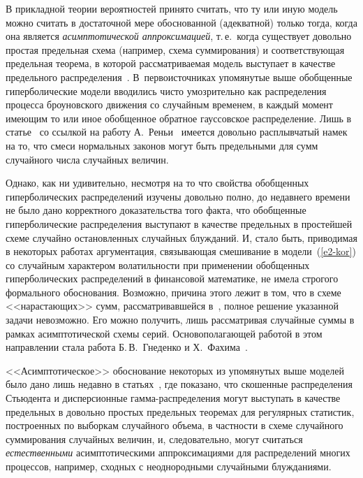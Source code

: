 \begin{multicols}{2}
В прикладной теории вероятностей принято считать, что ту или иную
модель можно считать в достаточной мере обоснованной (адекватной)
только тогда, когда она является {\it асимптотической
аппроксимацией}, т.\,е.\ когда существует довольно простая
предельная схема (например, схема суммирования) и соответствующая
предельная теорема, в которой рассматриваемая модель выступает в
качестве предельного распределения~\cite{GnedenkoKolmogorov1949}. 
В~первоисточниках упомянутые выше обобщенные гиперболические модели
вводились чисто умозрительно как распределения процесса броуновского
движения со случайным временем, в каждый момент имеющим то или иное
обобщенное обратное гауссовское распределение. Лишь в статье~\cite{BN1982} 
со ссылкой на работу А.~Реньи~\cite{Renyi1960} имеется
довольно расплывчатый намек на то, что смеси нормальных законов
могут быть предельными для сумм случайного числа случайных величин.

Однако, как ни удивительно, несмотря на то что свойства обобщенных
гиперболических распределений изучены довольно полно, до недавнего
времени не было дано корректного доказательства того факта, что
обобщенные гиперболические распределения выступают в качестве
предельных в прос\-тей\-шей схеме случайно остановленных случайных
блужданий. И, стало быть, приводимая в некоторых работах
аргументация, связывающая смешивание в модели~(\ref{e2-kor}) со случайным
характером во\-ла\-тиль\-ности при применении обобщенных гиперболических
распределений в финансовой математике, не имела строгого формального
обоснования. Возможно, причина этого лежит в том, что в схеме
<<нарастающих>> сумм, рассматривавшейся в~\cite{Renyi1960}, полное
решение указанной задачи невозможно. Его можно получить, лишь
рассматривая случайные суммы в рамках асимптотической схемы серий.
Основополагающей работой в этом направлении стала работа
Б.\,В.~Гнеденко и Х.~Фахима~\cite{GnedenkoFahim1969}.

<<Асимптотическое>> обоснование некоторых из упомянутых выше моделей
было дано лишь недавно в статьях~\cite{KorolevSokolov2012, Korolev2012}, 
где показано, что скошенные распределения Стьюдента и
дисперсионные гам\-ма-рас\-пре\-де\-ле\-ния могут выступать в качестве
предельных в довольно простых предельных теоремах для регулярных
статистик, построенных по выборкам случайного объема, в частности в
схеме случайного суммирования случайных величин, и, следовательно,
могут считаться {\it естественными} асимптотическими аппроксимациями
для распределений многих процессов, например, сходных с
неоднородными случайными блужданиями.


\end{multicols}
